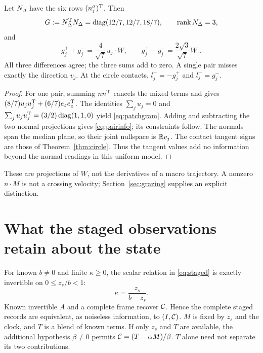 \begin{proposition}\label{prop:pairinfo}
Let $N_\Delta$ have the six rows $(n_j^\sigma)^{\mathrm T}$. Then
\begin{equation}\label{eq:patchgram}
G:=N_\Delta^{\mathrm T} N_\Delta=\operatorname{diag}(12/7,12/7,18/7),\qquad \operatorname{rank} N_\Delta=3,
\end{equation}
and
\begin{equation}\label{eq:pairinfo}
g_j^++g_j^-=\frac4{\sqrt7}u_j\cdot W,\qquad
g_j^+-g_j^-=\frac{2\sqrt3}{\sqrt7}W_z.
\end{equation}
All three differences agree; the three sums add to zero. A single pair misses exactly the direction $v_j$. At the circle contacts, $l_j^+=-g_j^+$ and $l_j^-=g_j^-$.
\end{proposition}
\begin{proof}
For one pair, summing $n n^{\mathrm T}$ cancels the mixed terms and gives $(8/7)u_ju_j^{\mathrm T}+(6/7)e_ze_z^{\mathrm T}$. The identities $\sum_j u_j=0$ and $\sum_j u_ju_j^{\mathrm T}=(3/2)\operatorname{diag}(1,1,0)$ yield \eqref{eq:patchgram}. Adding and subtracting the two normal projections gives \eqref{eq:pairinfo}; its constraints follow. The normals span the median plane, so their joint nullspace is $\mathbb R v_j$. The contact tangent signs are those of Theorem~\ref{thm:circle}. Thus the tangent values add no information beyond the normal readings in this uniform model.
\end{proof}
These are projections of $W$, not the derivatives of a macro trajectory. A nonzero $n\cdot M$ is not a crossing velocity; Section~\ref{sec:grazing} supplies an explicit distinction.

\section{What the staged observations retain about the state}\label{sec:rank}
For known $b\ne0$ and finite $\kappa\ge0$, the scalar relation in \eqref{eq:staged} is exactly invertible on $0\le z_s/b<1$:
\begin{equation}\label{eq:inverse}
\kappa=\frac{z_s}{b-z_s}.
\end{equation}
Known invertible $A$ and a complete frame recover $\mathcal C$. Hence the complete staged records are equivalent, as noiseless information, to $(I,\mathcal C)$. $M$ is fixed by $z_s$ and the clock, and $T$ is a blend of known terms. If only $z_s$ and $T$ are available, the additional hypothesis $\beta\ne0$ permits $\mathcal C=(T-\alpha M)/\beta$. $T$ alone need not separate its two contributions.

